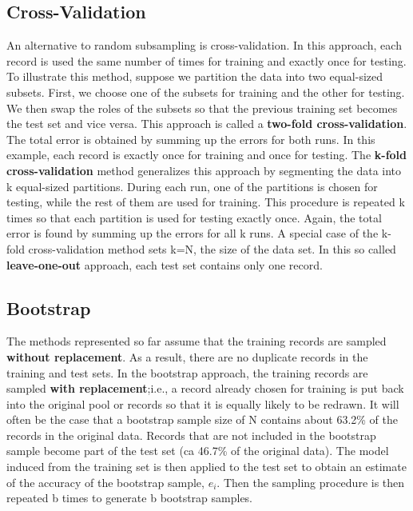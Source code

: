 		\subsection*{Cross-Validation}
		An alternative to random subsampling is cross-validation. In this approach, 
		each record is used the same number of times for training and exactly once 
		for testing. To illustrate this method, suppose we partition the data into
		two equal-sized subsets. First, we choose one of the subsets for training 
		and the other for testing. We then swap the roles of the subsets so that
		the previous training set becomes the test set and vice versa. This approach
		is called a {\bf two-fold cross-validation}. The total error is obtained by summing
		up the errors for both runs. In this example, each record is exactly once 
		for training and once for testing. The {\bf k-fold cross-validation} method
		generalizes this approach by segmenting the data into k equal-sized partitions.
		During each run, one of the partitions is chosen for testing, while the rest
		of them are used for training. This procedure is repeated k times so that
		each partition is used for testing exactly once. Again, the total error is
		found by summing up the errors for all k runs. 
		A special case of the k-fold cross-validation method sets k=N, the size of 
		the data set. In this so called {\bf leave-one-out} approach, each test set 
		contains only one record. 

		\subsection*{Bootstrap}
		The methods represented so far assume that the training records are sampled
		{\bf without replacement}. As a result, there are no duplicate records in the training
		and test sets. In the bootstrap approach, the training records are sampled 
		{\bf with replacement};i.e., a record already chosen for training is put back into
		the original pool or records so that it is equally likely to be redrawn. 
		It will often be the case that a bootstrap  sample size of N contains 
		about 63.2\% of the records in the original data. 
		Records that are not included in the bootstrap sample become part of the
		test set (ca 46.7\% of the original data).
		The model induced from the training set is then applied to the test set
		to obtain an estimate of the accuracy of the bootstrap sample, $e_{i}$.
		Then the sampling procedure is then repeated b times to generate b bootstrap
		samples. 

